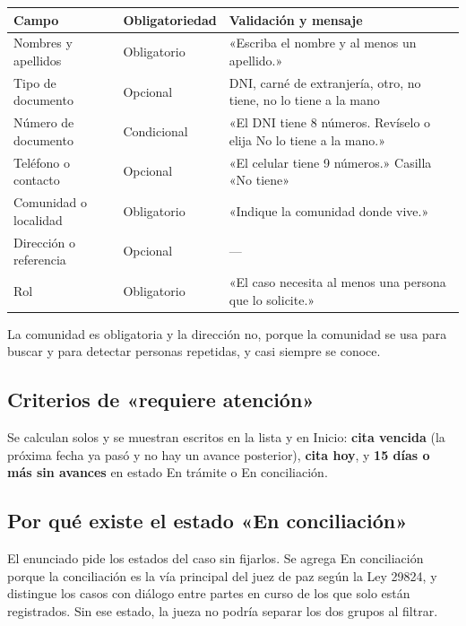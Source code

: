 \documentclass[11pt,a4paper]{article}
\begin{document}
\begin{center}
\small
\begin{tabular}{@{}p{3.0cm}p{2.6cm}p{8.6cm}@{}}
\toprule
\textbf{Campo} & \textbf{Obligatoriedad} & \textbf{Validación y mensaje} \\
\midrule
Nombres y apellidos & Obligatorio & «Escriba el nombre y al menos un apellido.» \\
Tipo de documento & Opcional & DNI, carné de extranjería, otro, no tiene, no lo tiene a la mano \\
Número de documento & Condicional & «El DNI tiene 8 números. Revíselo o elija No lo tiene a la mano.» \\
Teléfono o contacto & Opcional & «El celular tiene 9 números.» Casilla «No tiene» \\
Comunidad o localidad & Obligatorio & «Indique la comunidad donde vive.» \\
Dirección o referencia & Opcional & --- \\
Rol & Obligatorio & «El caso necesita al menos una persona que lo solicite.» \\
\bottomrule
\end{tabular}
\end{center}

La comunidad es obligatoria y la dirección no, porque la comunidad se usa para buscar y para detectar personas repetidas, y casi siempre se conoce.

\subsection{Criterios de «requiere atención»}

Se calculan solos y se muestran escritos en la lista y en Inicio: \textbf{cita vencida} (la próxima fecha ya pasó y no hay un avance posterior), \textbf{cita hoy}, y \textbf{15 días o más sin avances} en estado En trámite o En conciliación.

\subsection{Por qué existe el estado «En conciliación»}

El enunciado pide los estados del caso sin fijarlos. Se agrega En conciliación porque la conciliación es la vía principal del juez de paz según la Ley 29824, y distingue los casos con diálogo entre partes en curso de los que solo están registrados. Sin ese estado, la jueza no podría separar los dos grupos al filtrar.
\end{document}
